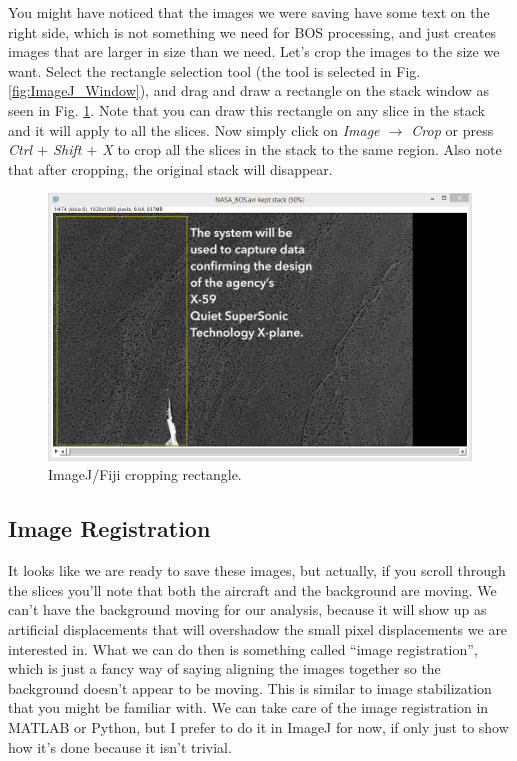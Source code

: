\documentclass[letterpaper,12pt]{article}
\begin{document}
You might have noticed that the images we were saving have some text on the right side, which is not something we need for BOS processing, and just creates images that are larger in size than we need.  Let's crop the images to the size we want.  Select the rectangle selection tool (the tool is selected in Fig. \ref{fig:ImageJ_Window}), and drag and draw a rectangle on the stack window as seen in Fig. \ref{fig:ImageJ_Crop_Rectangle}.  Note that you can draw this rectangle on any slice in the stack and it will apply to all the slices.  Now simply click on \textcolor{myMagenta}{\textit{Image $\rightarrow$ Crop}} or press \textit{Ctrl $+$ Shift $+$ X} to crop all the slices in the stack to the same region.  Also note that after cropping, the original stack will disappear.

\begin{figure}[h]
    \centering
    \includegraphics[width=0.8\linewidth]{ImageJ_Crop_Rectangle.PNG}
    \caption{ImageJ/Fiji cropping rectangle.}
    \label{fig:ImageJ_Crop_Rectangle}
\end{figure} 

\subsection{Image Registration}
\label{subsec:Image_Registration}

It looks like we are ready to save these images, but actually, if you scroll through the slices you'll note that both the aircraft and the background are moving.  We can't have the background moving for our analysis, because it will show up as artificial displacements that will overshadow the small pixel displacements we are interested in.  What we can do then is something called ``image registration'', which is just a fancy way of saying aligning the images together so the background doesn't appear to be moving.  This is similar to image stabilization that you might be familiar with.  We can take care of the image registration in MATLAB or Python, but I prefer to do it in ImageJ for now, if only just to show how it's done because it isn't trivial.
\end{document}
